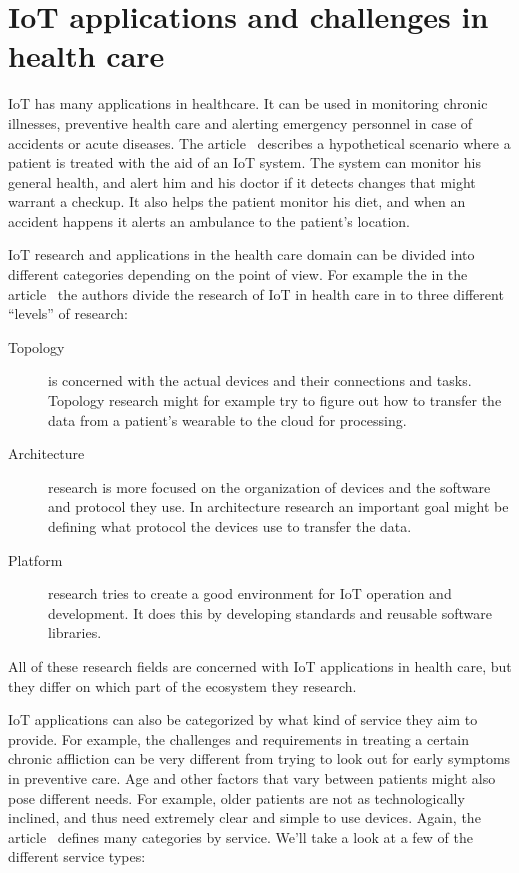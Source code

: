 \section{IoT applications and challenges in health care}
\label{sec:iot-health}

IoT has many applications in healthcare. It can be used in monitoring
chronic illnesses, preventive health care and alerting emergency personnel in
case of accidents or acute diseases. The article~\cite{Bui2011} describes a
hypothetical scenario where a patient is treated with the aid of an IoT system.
The system can monitor his general health, and alert him and his doctor if it
detects changes that might warrant a checkup. It also helps the patient monitor
his diet, and when an accident happens it alerts an ambulance to the patient's
location.

IoT research and applications in the health care domain can be divided into
different categories depending on the point of view. For example the in the
article~\cite{Islam2015} the authors divide the research of IoT in health care
in to three different ``levels'' of research:

\begin{description}
  \item[Topology] is concerned with the actual devices and their connections
    and tasks. Topology research might for example try to figure out how to
    transfer the data from a patient's wearable to the cloud for processing.

  \item[Architecture] research is more focused on the organization of devices
    and the software and protocol they use. In architecture research an
    important goal might be defining what protocol the devices use to transfer
    the data.

  \item[Platform] research tries to create a good environment for IoT
    operation and development. It does this by developing standards and
    reusable software libraries.

\end{description}

All of these research fields are concerned with IoT applications in health
care, but they differ on which part of the ecosystem they research.

IoT applications can also be categorized by what kind of service they aim to
provide. For example, the challenges and requirements in treating a certain
chronic affliction can be very different from trying to look out for early
symptoms in preventive care. Age and other factors that vary between patients
might also pose different needs. For example, older patients are not as
technologically inclined, and thus need extremely clear and simple to use
devices. Again, the article~\cite{Islam2015} defines many categories by
service. We'll take a look at a few of the different service types:

